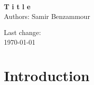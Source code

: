 \documentclass[a4paper, 12pt]{article}
\title{ }
\begin{document}
\begin{center}
	\begin{LARGE}
		\textbf{T i t l e}\\[2em]
		Authors:\n
		Samir Benzammour\n
	\end{LARGE}
	\vfill
	\vfill
	\vfill
	\vfill
	\begin{large}
		Last change:\\
		\today\\
	\end{large}
	\vfill
\end{center}
\newpage
\section{Introduction}
\end{document}
